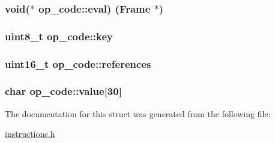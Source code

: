 \subsubsection[{\texorpdfstring{eval}{eval}}]{\setlength{\rightskip}{0pt plus 5cm}void($\ast$  op\+\_\+code\+::eval) ({\bf Frame} $\ast$)}\hypertarget{structop__code_acd2c8c9ef3e72b9f110127c854620472}{}\label{structop__code_acd2c8c9ef3e72b9f110127c854620472}
\subsubsection[{\texorpdfstring{key}{key}}]{\setlength{\rightskip}{0pt plus 5cm}uint8\+\_\+t op\+\_\+code\+::key}\hypertarget{structop__code_adfbb2fc6e07e6fda7e392c0b6f6f64b6}{}\label{structop__code_adfbb2fc6e07e6fda7e392c0b6f6f64b6}
\subsubsection[{\texorpdfstring{references}{references}}]{\setlength{\rightskip}{0pt plus 5cm}uint16\+\_\+t op\+\_\+code\+::references}\hypertarget{structop__code_a8d28fff7d91873f58a4a12205dd0f8e0}{}\label{structop__code_a8d28fff7d91873f58a4a12205dd0f8e0}
\subsubsection[{\texorpdfstring{value}{value}}]{\setlength{\rightskip}{0pt plus 5cm}char op\+\_\+code\+::value\mbox{[}30\mbox{]}}\hypertarget{structop__code_a0b74d91235a8b9f0a36710d68c2746d1}{}\label{structop__code_a0b74d91235a8b9f0a36710d68c2746d1}


The documentation for this struct was generated from the following file\+:\begin{DoxyCompactItemize}
\item 
\hyperlink{instructions_8h}{instructions.\+h}\end{DoxyCompactItemize}
